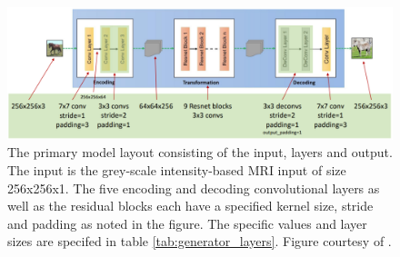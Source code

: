 \documentclass[12pt, fleqn, titlepage]{article}
\begin{document}
\begin{figure}[H]
	\centering
	\includegraphics[width=0.7\linewidth]{imgs/cyclegan_generator_layers}
	\caption{The primary model layout consisting of the input, layers and output. The input is the grey-scale intensity-based MRI input of size 256x256x1. The five encoding and decoding convolutional layers as well as the residual blocks each have a specified kernel size, stride and padding as noted in the figure. The specific values and layer sizes are specifed in table \ref{tab:generator_layers}. Figure courtesy of \cite{cyclegan_figures}.}
	\label{fig:cyclegangeneratorlayers}
\end{figure}
\end{document}
